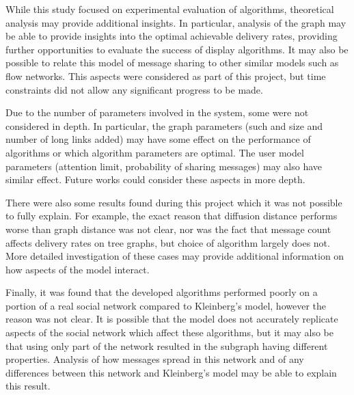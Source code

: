 \documentclass[bsc,frontabs,twoside,singlespacing,parskip,deptreport]{infthesis}     %
\begin{document}
While this study focused on experimental evaluation of algorithms, theoretical analysis may provide additional insights. In particular, analysis of the graph may be able to provide insights into the optimal achievable delivery rates, providing further opportunities to evaluate the success of display algorithms. It may also be possible to relate this model of message sharing to other similar models such as flow networks. This aspects were considered as part of this project, but time constraints did not allow any significant progress to be made.

Due to the number of parameters involved in the system, some were not considered in depth.
In particular, the graph parameters (such and size and number of long links added) may have some effect on the performance of algorithms or which algorithm parameters are optimal. The user model parameters (attention limit, probability of sharing messages) may also have similar effect. Future works could consider these aspects in more depth.

There were also some results found during this project which it was not possible to fully explain. For example, the exact reason that diffusion distance performs worse than graph distance was not clear, nor was the fact that message count affects delivery rates on tree graphs, but choice of algorithm largely does not. More detailed investigation of these cases may provide additional information on how aspects of the model interact.

Finally, it was found that the developed algorithms performed poorly on a portion of a real social network compared to Kleinberg's model, however the reason was not clear. It is possible that the model does not accurately replicate aspects of the social network which affect these algorithms, but it may also be that using only part of the network resulted in the subgraph having different properties. Analysis of how messages spread in this network and of any differences between this network and Kleinberg's model may be able to explain this result.



\end{document}
